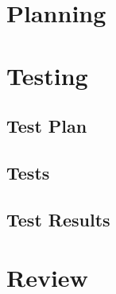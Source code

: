 \documentclass{article}
\begin{document}
\section{Planning}

\section{Testing}
\subsection{Test Plan}

\subsection{Tests}

\subsection{Test Results}

\section{Review}
\end{document}
